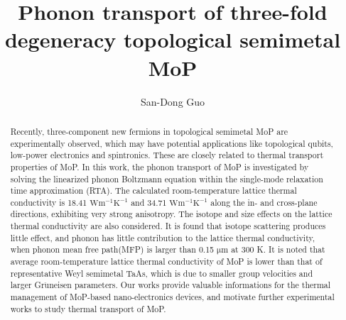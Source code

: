 \documentclass[twocolumn,showkeys,aps,prb,showpacs]{revtex4-1}
\begin{document}
\title{Phonon transport of three-fold degeneracy topological semimetal MoP}

\author{San-Dong Guo}


\begin{abstract}
Recently, three-component new fermions in topological semimetal MoP are  experimentally observed, which may have potential applications like topological qubits, low-power electronics and spintronics.  These are closely related to  thermal transport properties of MoP.
 In this work, the phonon transport  of  MoP is investigated  by solving  the linearized phonon Boltzmann equation within
the single-mode relaxation time approximation (RTA).
The calculated room-temperature lattice thermal conductivity  is  18.41  $\mathrm{W m^{-1} K^{-1}}$  and 34.71 $\mathrm{W m^{-1} K^{-1}}$ along the in-  and cross-plane directions, exhibiting very strong anisotropy.  The isotope and size effects on the lattice thermal conductivity are also considered. It is
found that isotope scattering produces little effect, and phonon has little contribution  to the lattice thermal conductivity, when  phonon mean free path(MFP) is larger than 0.15 $\mathrm{\mu m}$ at 300 K.
It is noted that average room-temperature lattice thermal conductivity of MoP is  lower than that of representative Weyl semimetal
TaAs, which is due to smaller group  velocities and larger Gr$\mathrm{\ddot{u}}$neisen parameters.  Our works provide  valuable informations for the thermal management of MoP-based nano-electronics devices, and motivate  further experimental works to study thermal transport of MoP.


\end{abstract}




\maketitle
\end{document}

